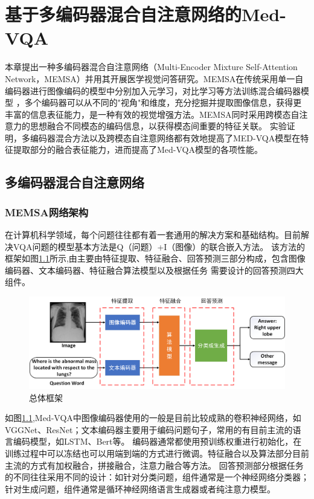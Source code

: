 \chapter{基于多编码器混合自注意网络的Med-VQA}
本章提出一种多编码器混合自注意网络（Multi-Encoder Mixture Self-Attention Network，MEMSA）并用其开展医学视觉问答研究。MEMSA在传统采用单一自编码器进行图像编码的模型中分别加入元学习，对比学习等方法训练混合编码器模型
，多个编码器可以从不同的"视角"和维度，充分挖掘并提取图像信息，获得更丰富的信息表征能力，是一种有效的视觉增强方法\cite{nguyen2019overcoming}。MEMSA同时采用跨模态自注意力的思想融合不同模态的编码信息，以获得模态间重要的特征关联。
实验证明，多编码器混合方法以及跨模态自注意网络都有效地提高了MED-VQA模型在特征提取部分的融合表征能力，进而提高了Med-VQA模型的各项性能。

\section{多编码器混合自注意网络}
\subsection{MEMSA网络架构}
在计算机科学领域，每个问题往往都有着一套通用的解决方案和基础结构。目前解决VQA问题的模型基本方法是Q（问题）+I（图像）的联合嵌入方法\cite{malinowski2015ask}。
该方法的框架如图\ref{Framwork}所示,由主要由特征提取、特征融合、回答预测三部分构成，包含图像编码器、文本编码器、特征融合算法模型以及根据任务
需要设计的回答预测四大组件。

\begin{figure}[htbp]
	\centering	
	\includegraphics[width=1\textwidth]{Fig/myfig/chapter3/popline2.png}  %
	\caption{\label{Framwork}总体框架} 
\end{figure}
如图\ref{Framwork},Med-VQA中图像编码器使用的一般是目前比较成熟的卷积神经网络，如VGGNet、ResNet；文本编码器主要用于编码问题句子，常用的有目前主流的语言编码模型，如LSTM、Bert等。
编码器通常都使用预训练权重进行初始化，在训练过程中可以冻结也可以用端到端的方式进行微调。特征融合以及算法部分目前主流的方式有加权融合，拼接融合，注意力融合等方法。
回答预测部分根据任务的不同往往采用不同的设计：如针对分类问题，组件通常是一个神经网络分类器；针对生成问题，组件通常是循环神经网络语言生成器或者纯注意力模型。

